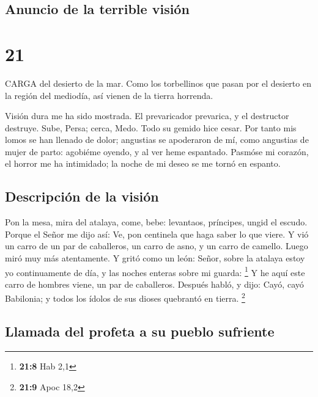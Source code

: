 \hypertarget{anuncio-de-la-terrible-visiuxf3n}{%
\subsection{Anuncio de la terrible
visión}\label{anuncio-de-la-terrible-visiuxf3n}}

\hypertarget{section-20}{%
\section{21}\label{section-20}}

 CARGA del desierto de la mar. Como los torbellinos que
pasan por el desierto en la región del mediodía, así vienen de la tierra
horrenda.

 Visión dura me ha sido mostrada. El prevaricador prevarica,
y el destructor destruye. Sube, Persa; cerca, Medo. Todo su gemido hice
cesar.  Por tanto mis lomos se han llenado de dolor;
angustias se apoderaron de mí, como angustias de mujer de parto:
agobiéme oyendo, y al ver heme espantado.  Pasmóse mi
corazón, el horror me ha intimidado; la noche de mi deseo se me tornó en
espanto.

\hypertarget{descripciuxf3n-de-la-visiuxf3n}{%
\subsection{Descripción de la
visión}\label{descripciuxf3n-de-la-visiuxf3n}}

 Pon la mesa, mira del atalaya, come, bebe: levantaos,
príncipes, ungid el escudo.  Porque el Señor me dijo así:
Ve, pon centinela que haga saber lo que viere.  Y vió un
carro de un par de caballeros, un carro de asno, y un carro de camello.
Luego miró muy más atentamente.  Y gritó como un león:
Señor, sobre la atalaya estoy yo continuamente de día, y las noches
enteras sobre mi guarda: \footnote{\textbf{21:8} Hab 2,1}  Y
he aquí este carro de hombres viene, un par de caballeros. Después
habló, y dijo: Cayó, cayó Babilonia; y todos los ídolos de sus dioses
quebrantó en tierra. \footnote{\textbf{21:9} Apoc 18,2}

\hypertarget{llamada-del-profeta-a-su-pueblo-sufriente}{%
\subsection{Llamada del profeta a su pueblo
sufriente}\label{llamada-del-profeta-a-su-pueblo-sufriente}}

